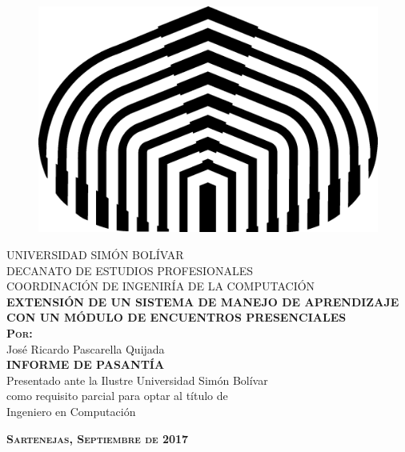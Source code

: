 \begin{titlepage}
\begin{center}

\begin{figure}[h]
\begin{center}
\includegraphics{logos/logoUSB.png}
\end{center}
\end{figure}

\textsc{UNIVERSIDAD SIMÓN BOLÍVAR}\\
\textsc{DECANATO DE ESTUDIOS PROFESIONALES}\\
\textsc{COORDINACIÓN DE INGENIRÍA DE LA COMPUTACIÓN}\\[8em]

\textsc{\Large \textbf{EXTENSIÓN DE UN SISTEMA DE MANEJO DE APRENDIZAJE CON UN MÓDULO DE ENCUENTROS PRESENCIALES}}\\[4em]

\textsc{ \textbf{Por:} }\\
José Ricardo Pascarella Quijada\\[4em]

\textsc{ \textbf{INFORME DE PASANTÍA} }\\
Presentado ante la Ilustre Universidad Simón Bolívar\\
como requisito parcial para optar al título de \\
Ingeniero en Computación

\vspace*{\fill}

\textsc{ \textbf{Sartenejas, Septiembre de 2017} }
\end{center}
\end{titlepage}